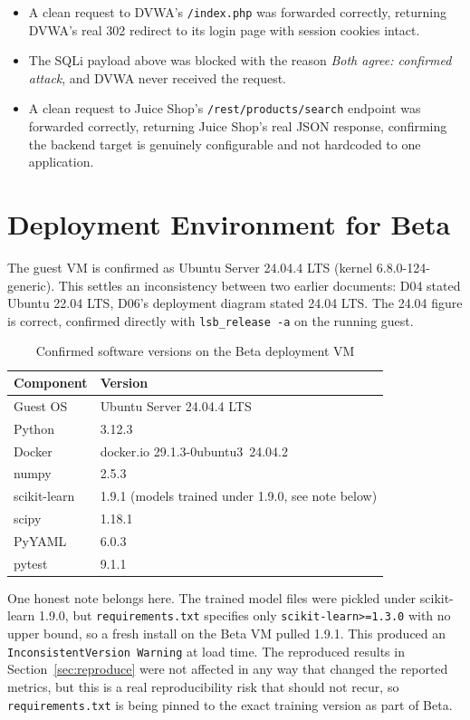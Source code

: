 \documentclass{llncs}
\begin{document}
\begin{itemize}
  \item A clean request to DVWA's \texttt{/index.php} was forwarded
        correctly, returning DVWA's real 302 redirect to its login page
        with session cookies intact.
  \item The SQLi payload above was blocked with the reason \emph{Both
        agree: confirmed attack}, and DVWA never received the request.
  \item A clean request to Juice Shop's \texttt{/rest/products/search}
        endpoint was forwarded correctly, returning Juice Shop's real
        JSON response, confirming the backend target is genuinely
        configurable and not hardcoded to one application.
\end{itemize}

\clearpage
\section{Deployment Environment for Beta}
\label{sec:env}

The guest VM is confirmed as Ubuntu Server 24.04.4 LTS (kernel
6.8.0-124-generic). This settles an inconsistency between two earlier
documents: D04 stated Ubuntu 22.04 LTS, D06's deployment diagram stated
24.04 LTS. The 24.04 figure is correct, confirmed directly with
\texttt{lsb\_release -a} on the running guest.

\begin{table}[h]
\centering
\caption{Confirmed software versions on the Beta deployment VM}
\begin{tabular}{ll}
\toprule
\textbf{Component} & \textbf{Version} \\
\midrule
Guest OS & Ubuntu Server 24.04.4 LTS \\
Python & 3.12.3 \\
Docker & docker.io 29.1.3-0ubuntu3~24.04.2 \\
numpy & 2.5.3 \\
scikit-learn & 1.9.1 (models trained under 1.9.0, see note below) \\
scipy & 1.18.1 \\
PyYAML & 6.0.3 \\
pytest & 9.1.1 \\
\bottomrule
\end{tabular}
\end{table}

One honest note belongs here. The trained model files were pickled
under scikit-learn 1.9.0, but \texttt{requirements.txt} specifies only
\texttt{scikit-learn>=1.3.0} with no upper bound, so a fresh install on
the Beta VM pulled 1.9.1. This produced an \texttt{InconsistentVersion\allowbreak
Warning} at load time. The reproduced results in
Section~\ref{sec:reproduce} were not affected in any way that changed
the reported metrics, but this is a real reproducibility risk that
should not recur, so \texttt{requirements.txt} is being pinned to the
exact training version as part of Beta.
\end{document}
